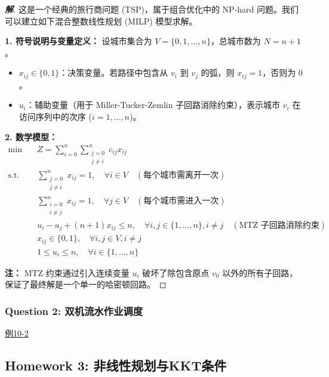 \documentclass[a4paper,12pt]{ctexart} %
\newenvironment{solution}{\begin{proof}[\textbf{解}]}{\end{proof}}
\begin{document}
	\begin{solution}
		这是一个经典的旅行商问题 (TSP)，属于组合优化中的 NP-hard 问题。我们可以建立如下混合整数线性规划 (MILP) 模型求解。
		
		\textbf{1. 符号说明与变量定义：}
		设城市集合为 $V = \{0, 1, \dots, n\}$，总城市数为 $N = n+1$。
		\begin{itemize}
			\item $x_{ij} \in \{0, 1\}$：决策变量。若路径中包含从 $v_i$ 到 $v_j$ 的弧，则 $x_{ij}=1$，否则为 $0$。
			\item $u_i$：辅助变量（用于 Miller-Tucker-Zemlin 子回路消除约束），表示城市 $v_i$ 在访问序列中的次序 ($i=1, \dots, n$)。
		\end{itemize}
		
		\textbf{2. 数学模型：}
		\[
		\begin{aligned}
			\min \quad & Z = \sum_{i=0}^n \sum_{\substack{j=0 \\ j \neq i}}^n c_{ij} x_{ij} \\
			\text{s.t.} \quad & \sum_{\substack{j=0 \\ j \neq i}}^n x_{ij} = 1, \quad \forall i \in V \quad (\text{每个城市需离开一次}) \\
			& \sum_{\substack{i=0 \\ i \neq j}}^n x_{ij} = 1, \quad \forall j \in V \quad (\text{每个城市需进入一次}) \\
			& u_i - u_j + (n+1) x_{ij} \le n, \quad \forall i, j \in \{1, \dots, n\}, i \neq j \quad (\text{MTZ 子回路消除约束}) \\
			& x_{ij} \in \{0, 1\}, \quad \forall i, j \in V, i \neq j \\
			& 1 \le u_i \le n, \quad \forall i \in \{1, \dots, n\}
		\end{aligned}
		\]
		
		\textbf{注：} MTZ 约束通过引入连续变量 $u_i$ 破坏了除包含原点 $v_0$ 以外的所有子回路，保证了最终解是一个单一的哈密顿回路。
	\end{solution}
	
	\subsubsection*{Question 2: 双机流水作业调度}\hyperref[1]{例10-2}

	
	\subsection{Homework 3: 非线性规划与KKT条件}
	
\end{document}
